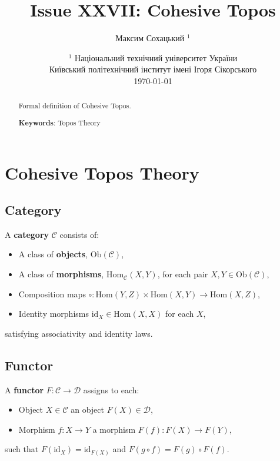 \documentclass{article}
\begin{document}
\title{Issue XXVII: Cohesive Topos}
\author{Максим Сохацький $^1$}
\date{ $^1$ Національний технічний університет України \\
       \small Київський політехнічний інститут імені Ігоря Сікорського \\
       \today }

\maketitle

\begin{abstract}

Formal definition of Cohesive Topos.

{\bf Keywords}: Topos Theory \\
\end{abstract}

\ifincludeTOC
  \tableofcontents
\fi

\section{Cohesive Topos Theory}

\subsection{Category}
A \textbf{category} $\mathcal{C}$ consists of:
\begin{itemize}
  \item A class of \textbf{objects}, $\mathrm{Ob}(\mathcal{C})$,
  \item A class of \textbf{morphisms}, $\mathrm{Hom}_{\mathcal{C}}(X,Y)$, for each pair $X,Y \in \mathrm{Ob}(\mathcal{C})$,
  \item Composition maps $\circ: \mathrm{Hom}(Y,Z) \times \mathrm{Hom}(X,Y) \to \mathrm{Hom}(X,Z)$,
  \item Identity morphisms $\mathrm{id}_X \in \mathrm{Hom}(X,X)$ for each $X$,
\end{itemize}
satisfying associativity and identity laws.

\subsection{Functor}
A \textbf{functor} $F: \mathcal{C} \to \mathcal{D}$ assigns to each:
\begin{itemize}
  \item Object $X \in \mathcal{C}$ an object $F(X) \in \mathcal{D}$,
  \item Morphism $f: X \to Y$ a morphism $F(f): F(X) \to F(Y)$,
\end{itemize}
such that $F(\mathrm{id}_X) = \mathrm{id}_{F(X)}$ and $F(g \circ f) = F(g) \circ F(f)$.
\end{document}
